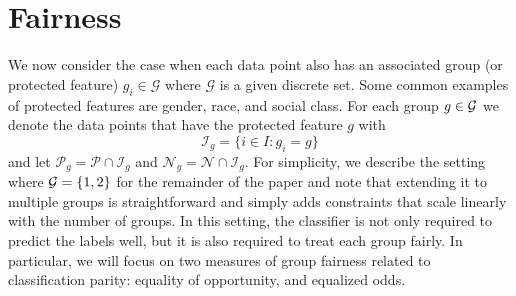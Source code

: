 \documentclass[twoside,11pt]{article}
\begin{document}

\section{Fairness}\label{sec:fairness}
We now consider the case when each data point also has an associated group (or protected feature) $g_i\in\mathcal{G}$ where $\mathcal{G}$ is a given discrete set. Some common examples of protected features are gender, race, and social class. For each group $g\in \mathcal{G}$ we denote the data points that have the protected feature $g$ with
	\begin{equation*}\mathcal{I}_g = \{i\in I : g_i = g \}\end{equation*}
and let $\mathcal{P}_g=\mathcal{P} \cap \mathcal{I}_g$ and $ \mathcal{N}_g=\mathcal{N} \cap \mathcal{I}_g$. For simplicity, we describe the setting where $\mathcal{G}=\{1,2\}$ for the remainder of the paper and note that extending it to multiple groups is straightforward and simply adds constraints that scale linearly with the number of groups. In this setting, the classifier is not only required to predict the labels well, but it is also required to treat each group fairly. In particular, we will focus on two measures of group fairness related to classification parity: equality of opportunity, and equalized odds.
\end{document}
